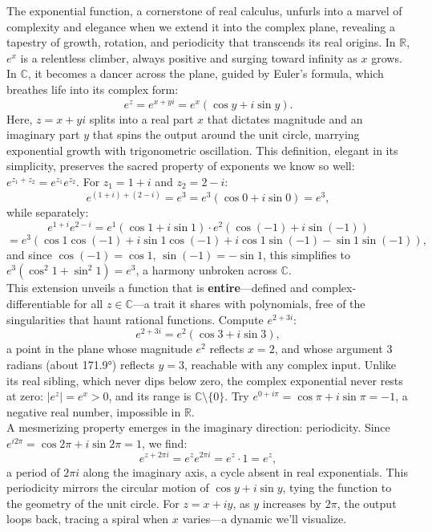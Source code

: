 \noindent The exponential function, a cornerstone of real calculus, unfurls into a marvel of complexity and elegance when we extend it into the complex plane, revealing a tapestry of growth, rotation, and periodicity that transcends its real origins. In $\mathbb{R}$, $e^x$ is a relentless climber, always positive and surging toward infinity as $x$ grows. In $\mathbb{C}$, it becomes a dancer across the plane, guided by Euler’s formula, which breathes life into its complex form:
\[
e^z = e^{x + yi} = e^x (\cos y + i \sin y).
\]
Here, $z = x + yi$ splits into a real part $x$ that dictates magnitude and an imaginary part $y$ that spins the output around the unit circle, marrying exponential growth with trigonometric oscillation. This definition, elegant in its simplicity, preserves the sacred property of exponents we know so well: $e^{z_1 + z_2} = e^{z_1} e^{z_2}$. For $z_1 = 1 + i$ and $z_2 = 2 - i$:
\[
e^{(1 + i) + (2 - i)} = e^{3} = e^3 (\cos 0 + i \sin 0) = e^3,
\]
while separately:
\[
e^{1 + i} e^{2 - i} = e^1 (\cos 1 + i \sin 1) \cdot e^2 (\cos (-1) + i \sin (-1))
\]
\[
 = e^3 (\cos 1 \cos (-1) + i \sin 1 \cos (-1) + i \cos 1 \sin (-1) - \sin 1 \sin (-1)),
\]
and since $\cos(-1) = \cos 1$, $\sin(-1) = -\sin 1$, this simplifies to $e^3 (\cos^2 1 + \sin^2 1) = e^3$, a harmony unbroken across $\mathbb{C}$. \\

\noindent This extension unveils a function that is \textbf{entire}—defined and complex-differentiable for all $z \in \mathbb{C}$—a trait it shares with polynomials, free of the singularities that haunt rational functions. Compute $e^{2 + 3i}$:
\[
e^{2 + 3i} = e^2 (\cos 3 + i \sin 3),
\]
a point in the plane whose magnitude $e^2$ reflects $x = 2$, and whose argument $3$ radians (about 171.9°) reflects $y = 3$, reachable with any complex input. Unlike its real sibling, which never dips below zero, the complex exponential never rests at zero: $|e^z| = e^x > 0$, and its range is $\mathbb{C} \setminus \{0\}$. Try $e^{0 + i\pi} = \cos \pi + i \sin \pi = -1$, a negative real number, impossible in $\mathbb{R}$. \\

\noindent A mesmerizing property emerges in the imaginary direction: periodicity. Since $e^{i 2\pi} = \cos 2\pi + i \sin 2\pi = 1$, we find:
\[
e^{z + 2\pi i} = e^z e^{2\pi i} = e^z \cdot 1 = e^z,
\]
a period of $2\pi i$ along the imaginary axis, a cycle absent in real exponentials. This periodicity mirrors the circular motion of $\cos y + i \sin y$, tying the function to the geometry of the unit circle. For $z = x + i y$, as $y$ increases by $2\pi$, the output loops back, tracing a spiral when $x$ varies—a dynamic we’ll visualize. \\

